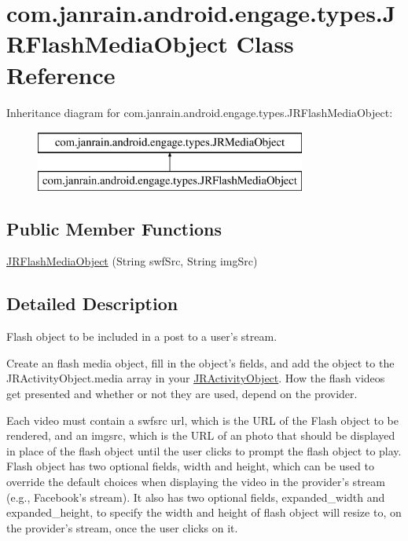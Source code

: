\hypertarget{classcom_1_1janrain_1_1android_1_1engage_1_1types_1_1_j_r_flash_media_object}{
\section{com.janrain.android.engage.types.JRFlashMediaObject Class Reference}
\label{classcom_1_1janrain_1_1android_1_1engage_1_1types_1_1_j_r_flash_media_object}
}
Inheritance diagram for com.janrain.android.engage.types.JRFlashMediaObject:\begin{figure}[H]
\begin{center}
\leavevmode
\includegraphics[height=2.000000cm]{classcom_1_1janrain_1_1android_1_1engage_1_1types_1_1_j_r_flash_media_object}
\end{center}
\end{figure}
\subsection*{Public Member Functions}
\begin{DoxyCompactItemize}
\item 
\hyperlink{classcom_1_1janrain_1_1android_1_1engage_1_1types_1_1_j_r_flash_media_object_a43ce407e77102f8745dd9aab7ddf2216}{JRFlashMediaObject} (String swfSrc, String imgSrc)
\end{DoxyCompactItemize}


\subsection{Detailed Description}
Flash object to be included in a post to a user's stream.

Create an flash media object, fill in the object's fields, and add the object to the JRActivityObject.media array in your \hyperlink{classcom_1_1janrain_1_1android_1_1engage_1_1types_1_1_j_r_activity_object}{JRActivityObject}. How the flash videos get presented and whether or not they are used, depend on the provider.

Each video must contain a swfsrc url, which is the URL of the Flash object to be rendered, and an imgsrc, which is the URL of an photo that should be displayed in place of the flash object until the user clicks to prompt the flash object to play. Flash object has two optional fields, width and height, which can be used to override the default choices when displaying the video in the provider's stream (e.g., Facebook's stream). It also has two optional fields, expanded\_\-width and expanded\_\-height, to specify the width and height of flash object will resize to, on the provider's stream, once the user clicks on it.

